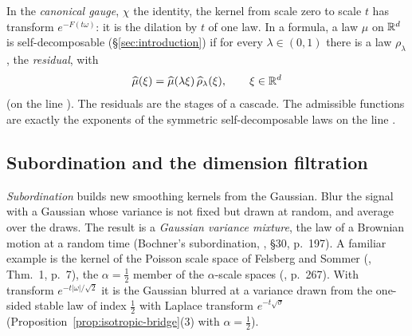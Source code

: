 In the \emph{canonical gauge}, $\chi$ the identity, the kernel from scale zero to scale $t$ has
transform $e^{-F(t\omega)}$: it is the dilation by $t$ of one law. In a formula, a law $\mu$ on
$\mathbb{R}^d$ is self-decomposable (\S\ref{sec:introduction}) if for every $\lambda \in (0,1)$ there
is a law $\rho_\lambda$, the \emph{residual}, with
\begin{equation}\label{eq:self-decomposable}
  \widehat\mu(\xi) = \widehat\mu(\lambda\xi)\,\widehat\rho_\lambda(\xi), \qquad \xi \in \mathbb{R}^d
\end{equation}
(on the line ). The residuals are the stages of a cascade. The
admissible functions are exactly the exponents of the symmetric self-decomposable laws on the line
.

\subsection{Subordination and the dimension filtration}\label{sec:line-bridge}

\emph{Subordination} builds new smoothing kernels from the Gaussian. Blur the signal with a
Gaussian whose variance is not fixed but drawn at random, and average over the draws. The result
is a \emph{Gaussian variance mixture}, the law of a Brownian motion at a random time (Bochner's
subordination, , \S30, p.~197). A familiar example is the kernel of the
Poisson scale space of Felsberg and Sommer (, Thm.~1, p.~7), the
$\alpha = \tfrac12$ member of the $\alpha$-scale spaces (, p.~267). With
transform $e^{-t|\omega|/\sqrt2}$ it is the Gaussian
blurred at a variance drawn from the one-sided stable law of index $\tfrac12$ with Laplace
transform $e^{-t\sqrt\sigma}$ (Proposition~\ref{prop:isotropic-bridge}(3) with
$\alpha = \tfrac12$).

